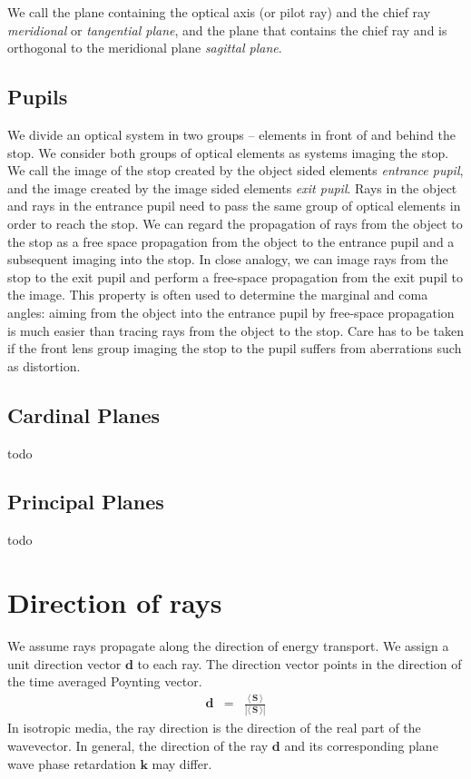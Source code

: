 \documentclass[12pt,a4paper,twoside,openright,BCOR10mm,headsepline,titlepage,abstracton,chapterprefix,final]{scrreprt}
\newcommand\Vector[1]{{\mathbf{#1}}}
\newcommand{\timeavg}[1]{{\langle\,#1\,\rangle}}
\begin{document}
We call the plane containing the optical axis (or pilot ray) and the chief ray \emph{meridional} or \emph{tangential plane}, 
and the plane that contains the chief ray and is orthogonal to the meridional plane \emph{sagittal plane}.

\subsection{Pupils}
We divide an optical system in two groups -- elements in front of and behind the stop. 
We consider both groups of optical elements as systems imaging the stop.
We call the image of the stop created by the object sided elements \emph{entrance pupil}, and the image created by the image sided elements \emph{exit pupil}.
Rays in the object and rays in the entrance pupil need to pass the same group of optical elements in order to reach the stop. 
We can regard the propagation of rays from the object to the stop as a free space propagation from the object to the entrance pupil and a subsequent imaging into the stop.
In close analogy, we can image rays from the stop to the exit pupil and perform a free-space propagation from the exit pupil to the image.
This property is often used to determine the marginal and coma angles: 
aiming from the object into the entrance pupil by free-space propagation is much easier than tracing rays from the object to the stop.
Care has to be taken if the front lens group imaging the stop to the pupil suffers from aberrations such as distortion.

\subsection{Cardinal Planes}
todo

\subsection{Principal Planes}
todo


\section{Direction of rays} \label{sec:raydir}
We assume rays propagate along the direction of energy transport.
We assign a unit direction vector $\Vector{d}$ to each ray.
The direction vector points in the direction of the time averaged Poynting vector.
\begin{eqnarray}
 \Vector{d} &=& \frac{\timeavg{\Vector{S}}}{|\timeavg{\Vector{S}}|}
\end{eqnarray}
In isotropic media, the ray direction is the direction of the real part of the wavevector.
In general, the direction of the ray $\Vector{d}$ and its corresponding plane wave phase retardation $\Vector{k}$ may differ.
\end{document}

